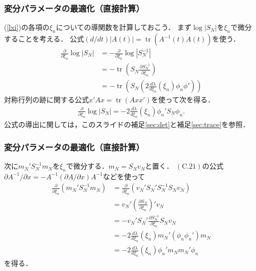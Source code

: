\documentclass[10pt,hyperref={unicode}]{beamer}
\DeclareMathOperator*{\tr}{tr}
\newcommand{\paref}[1]{{\fontfamily{cmr}\selectfont (\ref{#1})}}
\newcommand{\absolute}[1]{\left|#1\right|}
\newcommand{\parentheses}[1]{\left(#1\right)}
\begin{document}
\begin{frame}
\frametitle{変分パラメータの最適化（直接計算）}
\paref{lxi}の各項の$\xi_n$についての導関数を計算しておこう．
まず$\log \absolute{S_N}$を$\xi_n$で微分することを考える．
公式$\parentheses{d/dt}\absolute{A\parentheses{t}} = \tr \parentheses{A^{-1}\parentheses{t}\dot{A}\parentheses{t}}$を使う．
\begin{align*}
    \frac{\partial}{\partial \xi_n} \log \absolute{S_N}
    &= -\frac{\partial}{\partial \xi_n} \log \absolute{S_N^{-1}} \\
    &= -\tr\parentheses{S_N\frac{\partial S_N^{-1}}{\partial \xi_n}} \\
    &= -\tr\parentheses{S_N\parentheses{2\frac{d\lambda}{d\xi_n}\parentheses{\xi_n}\phi_n\phi'}}
\end{align*}
対称行列の跡に関する公式$x'Ax = \tr \parentheses{Axx'}$を使って次を得る．
\begin{align*}
    \frac{\partial}{\partial \xi_n} \log \absolute{S_N}
    = -2 \frac{d\lambda}{d\xi_n}\parentheses{\xi_n}\phi_n'S_N \phi_n.
\end{align*}
公式の導出に関しては，このスライドの補足\ref{sec:det}と補足\ref{sec:trace}を参照．
\end{frame}

\begin{frame}
\frametitle{変分パラメータの最適化（直接計算）}
次に$m_N'S_N^{-1}m_N$を$\xi_n$で微分する．$m_N = S_Nv_N$と置く．
$(\mathrm{C}.21)$の公式$\partial A^{-1}/\partial x = -A^{-1}(\partial A/\partial x)A^{-1}$などを使って
\begin{align*}
    \frac{\partial}{\partial \xi_n}\parentheses{m_N'S_N^{-1}m_N}
    &= \frac{\partial}{\partial \xi_n}\parentheses{v_N' S_N' S_N^{-1}S_N v_N} \\
    &= v_N'\parentheses{\frac{\partial S_N}{\partial \xi_n}}'v_N \\
    &= - v_N'S_N'\frac{\partial S_N^{-1}}{\partial \xi_n}S_Nv_N \\
    &= - 2\frac{d\lambda}{d\xi_n}\parentheses{\xi_n}m_N'\parentheses{\phi_n\phi_n'}m_N \\
    &= - 2\frac{d\lambda}{d\xi_n}\parentheses{\xi_n}\phi_n'm_Nm_N'\phi_n
\end{align*}
を得る．
\end{frame}
\end{document}
